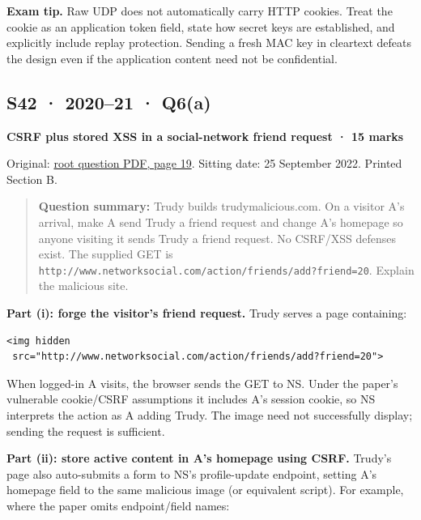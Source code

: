 \documentclass[11pt,a4paper]{article}
\begin{document}
{\color{ForestGreen}\textbf{Exam tip.} Raw UDP does not automatically carry HTTP cookies. Treat the cookie as an application token field,\allowbreak{} state how secret keys are established,\allowbreak{} and explicitly include replay protection. Sending a fresh MAC key in cleartext defeats the design even if the application content need not be confidential.}




\clearpage
\subsection{S42 · 2020–21 · Q6(a)}\label{s42}

\textbf{CSRF plus stored XSS in a social-network friend request · 15 marks}


Original: \href{../../CSE405-Security_Merged.pdf\#page=19}{root question PDF,\allowbreak{} page 19}. Sitting date: 25 September 2022. Printed Section B.



\begin{quote}\small

\textbf{Question summary:} Trudy builds trudymalicious.\allowbreak{}com. On a visitor A’s arrival,\allowbreak{} make A send Trudy a friend request and change A’s homepage so anyone visiting it sends Trudy a friend request. No CSRF/\allowbreak{}XSS defenses exist. The supplied GET is \nolinkurl{http://www.networksocial.com/action/friends/add?friend=20}. Explain the malicious site.



\end{quote}

\textbf{Part (i): forge the visitor’s friend request.} Trudy serves a page containing:



\begin{Verbatim}[breaklines=true,breakanywhere=true,fontsize=\small,frame=single,rulecolor=\color{PanelBorder}]
<img hidden
 src="http://www.networksocial.com/action/friends/add?friend=20">
\end{Verbatim}

When logged-in A visits,\allowbreak{} the browser sends the GET to NS. Under the paper’s vulnerable cookie/\allowbreak{}CSRF assumptions it includes A’s session cookie,\allowbreak{} so NS interprets the action as A adding Trudy. The image need not successfully display; sending the request is sufficient.


\textbf{Part (ii): store active content in A’s homepage using CSRF.} Trudy’s page also auto-submits a form to NS’s profile-update endpoint,\allowbreak{} setting A’s homepage field to the same malicious image (or equivalent script). For example,\allowbreak{} where the paper omits endpoint/\allowbreak{}field names:
\end{document}
